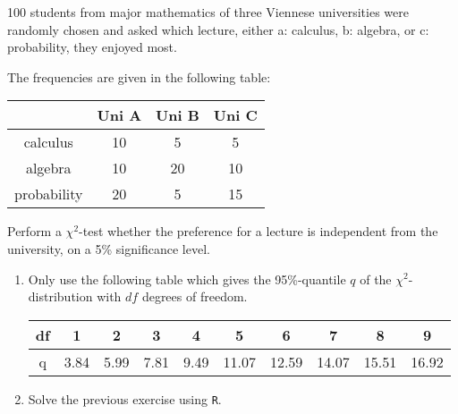 
\begin{exercise}

100 students from major mathematics of three Viennese universities
were randomly chosen and asked which lecture, either a: calculus,
b: algebra, or c: probability, they enjoyed most.

The frequencies are given in the following table:

\begin{center}
    \begin{tabular}{c|c|c|c}
        & Uni A & Uni B & Uni C \\
        \hline
        calculus & 10 & 5 & 5 \\
        \hline
        algebra & 10 & 20 & 10 \\
        \hline
        probability & 20 & 5 & 15
    \end{tabular}
\end{center}

Perform a $\chi^2$-test whether the preference for a lecture is independent
from the university, on a 5\% significance level.

\begin{enumerate}[label = (\alph*)]
    \item Only use the following table which gives the 95\%-quantile $q$
    of the $\chi^2$-distribution with $df$ degrees of freedom.

    \begin{center}
        \begin{tabular}{c||c|c|c|c|c|c|c|c|c}
            df & 1 & 2 & 3 & 4 & 5 & 6 & 7 & 8 & 9 \\
            \hline
            q & 3.84 & 5.99 & 7.81 & 9.49 & 11.07 & 12.59 & 14.07 & 15.51 & 16.92
        \end{tabular}
    \end{center}

    \item Solve the previous exercise using \texttt{R}.
\end{enumerate}

\end{exercise}



